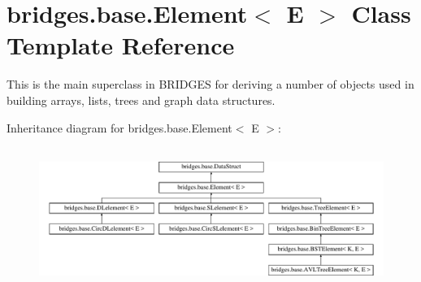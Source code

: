 \hypertarget{classbridges_1_1base_1_1_element}{}\section{bridges.\+base.\+Element$<$ E $>$ Class Template Reference}
\label{classbridges_1_1base_1_1_element}


This is the main superclass in B\+R\+I\+D\+G\+ES for deriving a number of objects used in building arrays, lists, trees and graph data structures.  


Inheritance diagram for bridges.\+base.\+Element$<$ E $>$\+:\begin{figure}[H]
\begin{center}
\leavevmode
\includegraphics[height=4.647303cm]{classbridges_1_1base_1_1_element}
\end{center}
\end{figure}
